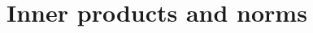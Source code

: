 \documentclass{book}
\theoremstyle{definition}
\begin{document}
%
%
%
%
%

\newpage

\chapter{Inner products and norms} 
\end{document}

